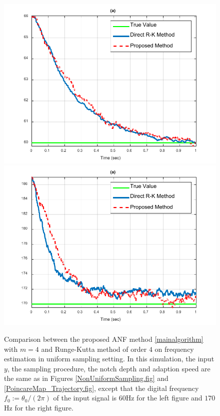 \documentclass{UCF_ETD}
\begin{document}
\begin{figure}[H]
\begin{center}
\includegraphics[scale=0.8]{NonuniformANF/Convergence_RK_OUR_1}
\includegraphics[scale=0.8]{NonuniformANF/Convergence_RK_OUR_2}
\caption{Comparison between the proposed ANF method \eqref{mainalgorithm} with $m=4$ and Runge-Kutta method
 of order $4$ on frequency estimation in uniform sampling setting.
 In this simulation, the  input $y$, the sampling  procedure, the notch  depth  and adaption speed
are the same as in Figures  \ref{NonUniformSampling.fig} and \ref{PoincareMap_Trajectory.fig},  except that
the digital frequency $f_0:=\theta_0/(2\pi)$ of the input signal is $60$Hz for the left figure and $170$Hz for the right figure. }
\label{ComparisonADM_RK_Our_60.fig}
\end{center}
\end{figure}
\end{document}
